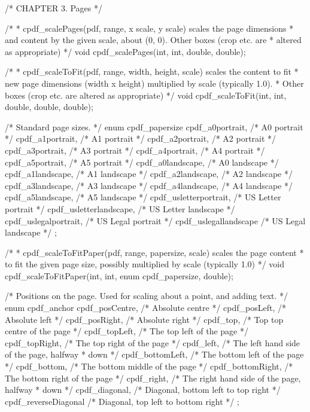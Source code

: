 /* CHAPTER 3. Pages */

/*
 * cpdf_scalePages(pdf, range, x scale, y scale) scales the page dimensions
 * and content by the given scale, about (0, 0). Other boxes (crop etc. are
 * altered as appropriate)
 */
void cpdf_scalePages(int, int, double, double);

/*
 * cpdf_scaleToFit(pdf, range, width, height, scale) scales the content to fit
 * new page dimensions (width x height) multiplied by scale (typically 1.0).
 * Other boxes (crop etc. are altered as appropriate)
 */
void cpdf_scaleToFit(int, int, double, double, double);

/* Standard page sizes. */
enum cpdf_papersize {
  cpdf_a0portrait,        /* A0 portrait */
  cpdf_a1portrait,        /* A1 portrait */
  cpdf_a2portrait,        /* A2 portrait */
  cpdf_a3portrait,        /* A3 portrait */
  cpdf_a4portrait,        /* A4 portrait */
  cpdf_a5portrait,        /* A5 portrait */
  cpdf_a0landscape,       /* A0 landscape */
  cpdf_a1landscape,       /* A1 landscape */
  cpdf_a2landscape,       /* A2 landscape */
  cpdf_a3landscape,       /* A3 landscape */
  cpdf_a4landscape,       /* A4 landscape */
  cpdf_a5landscape,       /* A5 landscape */
  cpdf_usletterportrait,  /* US Letter portrait */
  cpdf_usletterlandscape, /* US Letter landscape */
  cpdf_uslegalportrait,   /* US Legal portrait */
  cpdf_uslegallandscape   /* US Legal landscape */
};

/*
 * cpdf_scaleToFitPaper(pdf, range, papersize, scale) scales the page content
 * to fit the given page size, possibly multiplied by scale (typically 1.0)
 */
void cpdf_scaleToFitPaper(int, int, enum cpdf_papersize, double);

/* Positions on the page. Used for scaling about a point, and adding text. */
enum cpdf_anchor {
  cpdf_posCentre,      /* Absolute centre */
  cpdf_posLeft,        /* Absolute left */
  cpdf_posRight,       /* Absolute right */
  cpdf_top,            /* Top top centre of the page */
  cpdf_topLeft,        /* The top left of the page */
  cpdf_topRight,       /* The top right of the page */
  cpdf_left,           /* The left hand side of the page, halfway
                        * down */
  cpdf_bottomLeft,     /* The bottom left of the page */
  cpdf_bottom,         /* The bottom middle of the page */
  cpdf_bottomRight,    /* The bottom right of the page */
  cpdf_right,          /* The right hand side of the page, halfway
                        * down */
  cpdf_diagonal,       /* Diagonal, bottom left to top right */
  cpdf_reverseDiagonal /* Diagonal, top left to bottom right */
};

